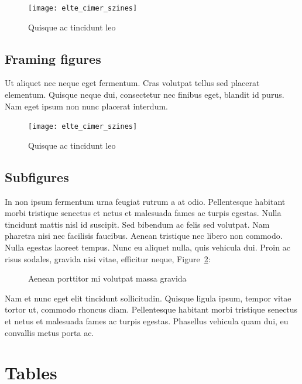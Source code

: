 		\begin{figure}[H]
			\centering
			\texttt{[image: elte\_cimer\_szines]}
			\caption{Quisque ac tincidunt leo}
			\label{fig:example-1}
		\end{figure}

		\subsection{Framing figures}

		Ut aliquet nec neque eget fermentum. Cras volutpat tellus sed placerat elementum. Quisque neque dui, consectetur nec finibus eget, blandit id purus. Nam eget ipsum non nunc placerat interdum.

		\begin{figure}[H]
			\centering
			\texttt{[image: elte\_cimer\_szines]}
			\caption{Quisque ac tincidunt leo}
		\end{figure}

		\subsection{Subfigures}

		In non ipsum fermentum urna feugiat rutrum a at odio. Pellentesque habitant morbi tristique senectus et netus et malesuada fames ac turpis egestas. Nulla tincidunt mattis nisl id suscipit. Sed bibendum ac felis sed volutpat. Nam pharetra nisi nec facilisis faucibus. Aenean tristique nec libero non commodo. Nulla egestas laoreet tempus. Nunc eu aliquet nulla, quis vehicula dui. Proin ac risus sodales, gravida nisi vitae, efficitur neque, Figure~\ref{fig:example-2}:

		\begin{figure}[H]
			\centering
			\hspace{5pt}
			\caption{Aenean porttitor mi volutpat massa gravida}
			\label{fig:example-2}
		\end{figure}

		Nam et nunc eget elit tincidunt sollicitudin. Quisque ligula ipsum, tempor vitae tortor ut, commodo rhoncus diam. Pellentesque habitant morbi tristique senectus et netus et malesuada fames ac turpis egestas. Phasellus vehicula quam dui, eu convallis metus porta ac.


		\section{Tables}

